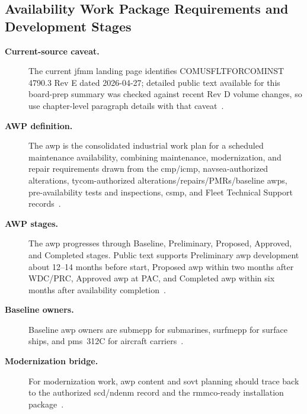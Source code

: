 \documentclass[../main.tex]{subfiles}
\begin{document}
\subsection{Availability Work Package Requirements and Development Stages}
\begin{description}
  \item[\textbf{Current-source caveat.}] The current \ac{jfmm} landing page identifies COMUSFLTFORCOMINST 4790.3
        Rev E dated 2026-04-27; detailed public text available for this board-prep summary was checked against recent
        Rev D volume changes, so use chapter-level paragraph details with that caveat~\autocite{COMFLTFORCOMINST4790-3}.
  \item[\textbf{AWP definition.}] The \ac{awp} is the consolidated industrial work plan for a scheduled maintenance
        availability, combining maintenance, modernization, and repair requirements drawn from the \ac{cmp}/\ac{icmp},
        \ac{navsea}-authorized alterations, \ac{tycom}-authorized alterations/repairs/PMRs/baseline \acp{awp},
        pre-availability tests and inspections, \ac{csmp}, and Fleet Technical Support records~\autocite{COMFLTFORCOMINST4790-3,edo-4-2-1-cno-availability-planning-2025}.
  \item[\textbf{AWP stages.}] The \ac{awp} progresses through Baseline, Preliminary, Proposed, Approved, and Completed
        stages. Public text supports Preliminary \ac{awp} development about 12--14 months before start, Proposed
        \ac{awp} within two months after WDC/PRC, Approved \ac{awp} at PAC, and Completed \ac{awp} within six months
        after availability completion~\autocite{COMFLTFORCOMINST4790-3,edo-4-2-1-cno-availability-planning-2025}.
  \item[\textbf{Baseline owners.}] Baseline \ac{awp} owners are \ac{submepp} for submarines, \ac{surfmepp} for
        surface ships, and \ac{pms}~312C for aircraft carriers~\autocite{COMFLTFORCOMINST4790-3,edo-4-2-1-cno-availability-planning-2025}.
  \item[\textbf{Modernization bridge.}] For modernization work, \ac{awp} content and \ac{sovt} planning should trace
        back to the authorized \ac{scd}/\ac{ndenm} record and the \ac{rmmco}-ready installation package~\autocite{JFMM-VolVI-RevD-Chg5-2025,TS9090-310}.
\end{description}
\end{document}
